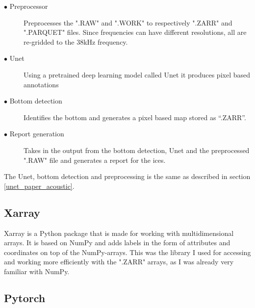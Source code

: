             \begin{description}
              \item[$\bullet$ Preprocessor] Preprocesses the ".RAW" and ".WORK" to respectively ".ZARR" and ".PARQUET" files. Since frequencies can have different resolutions, all are re-gridded to the 38kHz frequency.
              \item[$\bullet$ Unet] Using a pretrained deep learning model called Unet it produces pixel based annotations
              \item[$\bullet$ Bottom detection] Identifies the bottom and generates a pixel based map stored as “.ZARR”.
              \item[$\bullet$ Report generation] Takes in the output from the bottom detection, Unet and the preprocessed ".RAW" file and generates a report for the \gls{ices}.
    
            \end{description}

        The Unet, bottom detection and preprocessing is the same as described in section \ref{unet_paper_acoustic}.

    \subsection{Xarray}
        Xarray\cite{xarray} is a Python package that is made for working with multidimensional arrays. It is based on NumPy and adds labels in the form of attributes and coordinates on top of the NumPy-arrays. This was the library I used for accessing and working more efficiently with the ".ZARR" arrays, as I was already very familiar with NumPy.
        
        
    \subsection{Pytorch} \label{Pytorch}
    
    
